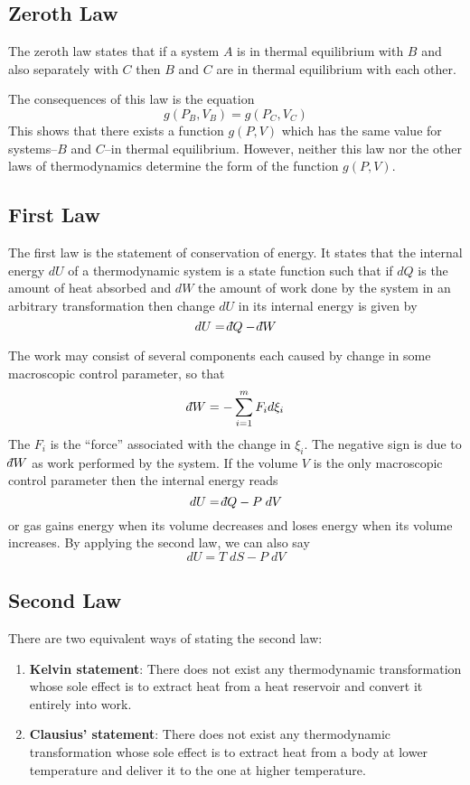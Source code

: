 \documentclass[../../../Main.tex]{subfiles}
\begin{document}
\subsection*{Zeroth Law}
The zeroth law states that if a system $A$ is in thermal equilibrium with $B$ and also separately with $C$ then $B$ and $C$ are in thermal equilibrium with each other. 

The consequences of this law is the equation
\begin{equation*}
    g(P_B , V_B ) = g(P_C , V_C )
\end{equation*}
This shows that there exists a function $g(P, V )$ which has the same value for systems--$B$ and $C$--in thermal equilibrium. However, neither this law nor the other laws of thermodynamics determine the form of the function $g(P, V )$.

\subsection*{First Law}
The first law is the statement of conservation of energy. It states that the internal energy $dU$ of a thermodynamic system is a state function such that if $d Q$ is the amount of heat absorbed and $d W $ the amount of work done by the system in an arbitrary transformation then change $d U$ in its internal energy is given by
\begin{equation*}
    d U=\dbar Q- \dbar W
\end{equation*}

The work may consist of several components each caused by change in some macroscopic control parameter, so that
\begin{equation*}
    \dbar W=-\sum_{i=1}^{m}F_id\xi_i
\end{equation*}
The $F_i$ is the “force” associated with the change in $\xi_i$. The negative sign is due to $\dbar W$ as work performed by the system. If the volume $V$ is the only macroscopic control parameter then the internal energy reads
\begin{equation*}
    dU=\dbar Q-P\;dV
\end{equation*}
or gas gains energy when its volume decreases and loses energy when its volume increases. By applying the second law, we can also say 
\begin{equation*}
    dU=T\;dS-P\;dV
\end{equation*}

\subsection*{Second Law}
There are two equivalent ways of stating the second law:
\begin{enumerate}
    \item \textbf{Kelvin statement}: There does not exist any thermodynamic transformation whose sole effect is to extract heat from a heat reservoir and convert it entirely into work.
    \item \textbf{Clausius' statement}: There does not exist any thermodynamic transformation whose sole effect is to extract heat from a body at lower temperature and deliver it to the one at higher temperature.
\end{enumerate}
\end{document}
